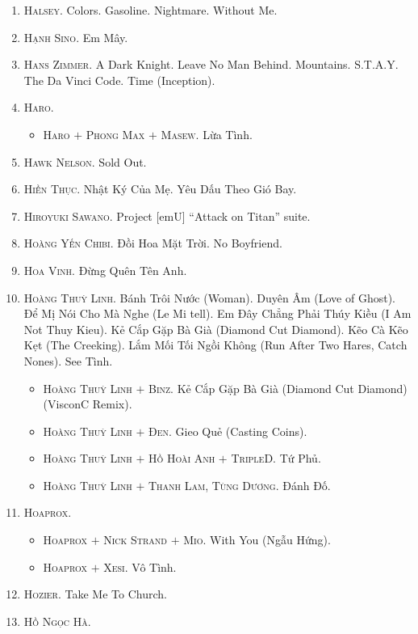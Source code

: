 \documentclass{article}
\begin{document}
\begin{enumerate}
	\item \textsc{Halsey.} Colors. Gasoline. Nightmare. Without Me.
	\item \textsc{Hạnh Sino.} Em Mây.
	\item \textsc{Hans Zimmer.} A Dark Knight. Leave No Man Behind. Mountains. S.T.A.Y. The Da Vinci Code. Time (Inception).
	\item \textsc{Haro.}
	\begin{itemize}
		\item \textsc{Haro $+$ Phong Max $+$ Masew.} Lừa Tình.
	\end{itemize}
	\item \textsc{Hawk Nelson.} Sold Out.
	\item \textsc{Hiền Thục.} Nhật Ký Của Mẹ. Yêu Dấu Theo Gió Bay.
	\item \textsc{Hiroyuki Sawano.} Project [emU] ``Attack on Titan'' suite.
	\item \textsc{Hoàng Yến Chibi.} Đồi Hoa Mặt Trời. No Boyfriend.
	\item \textsc{Hoa Vinh.} Đừng Quên Tên Anh.
	\item \textsc{Hoàng Thuỳ Linh.} Bánh Trôi Nước (Woman). Duyên Âm (Love of Ghost). Để Mị Nói Cho Mà Nghe (Le Mi tell). Em Đây Chẳng Phải Thúy Kiều (I Am Not Thuy Kieu). Kẻ Cắp Gặp Bà Già (Diamond Cut Diamond). Kẽo Cà Kẽo Kẹt (The Creeking). Lắm Mối Tối Ngồi Không (Run After Two Hares, Catch Nones). See Tình.
	\begin{itemize}
		\item \textsc{Hoàng Thuỳ Linh $+$ Binz.} Kẻ Cắp Gặp Bà Già (Diamond Cut Diamond) (VisconC Remix). 
		\item \textsc{Hoàng Thuỳ Linh $+$ Đen.} Gieo Quẻ (Casting Coins).
		\item \textsc{Hoàng Thuỳ Linh $+$ Hồ Hoài Anh $+$ TripleD.} Tứ Phủ.
		\item \textsc{Hoàng Thuỳ Linh $+$ Thanh Lam, Tùng Dương.} Đánh Đố.
	\end{itemize}
	\item \textsc{Hoaprox.}
	\begin{itemize}
		\item \textsc{Hoaprox $+$ Nick Strand $+$ Mio.} With You (Ngẫu Hứng).
		\item \textsc{Hoaprox $+$ Xesi.} Vô Tình.
	\end{itemize}
	\item \textsc{Hozier.} Take Me To Church.
	\item \textsc{Hồ Ngọc Hà.}
	\begin{itemize}

\end{itemize}
\end{enumerate}
\end{document}
